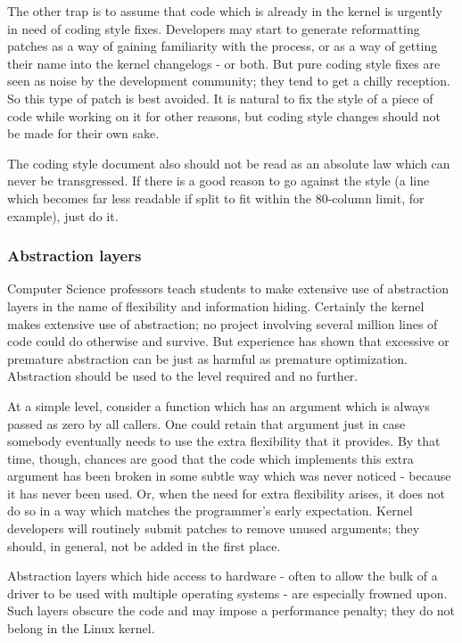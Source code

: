 \documentclass[a4paper,8pt,english]{sphinxmanual}
\begin{document}
The other trap is to assume that code which is already in the kernel is
urgently in need of coding style fixes.  Developers may start to generate
reformatting patches as a way of gaining familiarity with the process, or
as a way of getting their name into the kernel changelogs - or both.  But
pure coding style fixes are seen as noise by the development community;
they tend to get a chilly reception.  So this type of patch is best
avoided.  It is natural to fix the style of a piece of code while working
on it for other reasons, but coding style changes should not be made for
their own sake.

The coding style document also should not be read as an absolute law which
can never be transgressed.  If there is a good reason to go against the
style (a line which becomes far less readable if split to fit within the
80-column limit, for example), just do it.


\subsubsection{Abstraction layers}
\label{process/4.Coding:abstraction-layers}
Computer Science professors teach students to make extensive use of
abstraction layers in the name of flexibility and information hiding.
Certainly the kernel makes extensive use of abstraction; no project
involving several million lines of code could do otherwise and survive.
But experience has shown that excessive or premature abstraction can be
just as harmful as premature optimization.  Abstraction should be used to
the level required and no further.

At a simple level, consider a function which has an argument which is
always passed as zero by all callers.  One could retain that argument just
in case somebody eventually needs to use the extra flexibility that it
provides.  By that time, though, chances are good that the code which
implements this extra argument has been broken in some subtle way which was
never noticed - because it has never been used.  Or, when the need for
extra flexibility arises, it does not do so in a way which matches the
programmer's early expectation.  Kernel developers will routinely submit
patches to remove unused arguments; they should, in general, not be added
in the first place.

Abstraction layers which hide access to hardware - often to allow the bulk
of a driver to be used with multiple operating systems - are especially
frowned upon.  Such layers obscure the code and may impose a performance
penalty; they do not belong in the Linux kernel.
\end{document}
